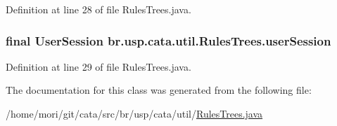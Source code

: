 Definition at line 28 of file Rules\+Trees.\+java.

\hypertarget{classbr_1_1usp_1_1cata_1_1util_1_1_rules_trees_aae7be5fb6afb386509a5b91c91b8c559}{
\subsubsection[{user\+Session}]{\setlength{\rightskip}{0pt plus 5cm}final {\bf User\+Session} br.\+usp.\+cata.\+util.\+Rules\+Trees.\+user\+Session\hspace{0.3cm}{\ttfamily [private]}}}\label{classbr_1_1usp_1_1cata_1_1util_1_1_rules_trees_aae7be5fb6afb386509a5b91c91b8c559}


Definition at line 29 of file Rules\+Trees.\+java.



The documentation for this class was generated from the following file\+:\begin{DoxyCompactItemize}
\item 
/home/mori/git/cata/src/br/usp/cata/util/\hyperlink{_rules_trees_8java}{Rules\+Trees.\+java}\end{DoxyCompactItemize}
